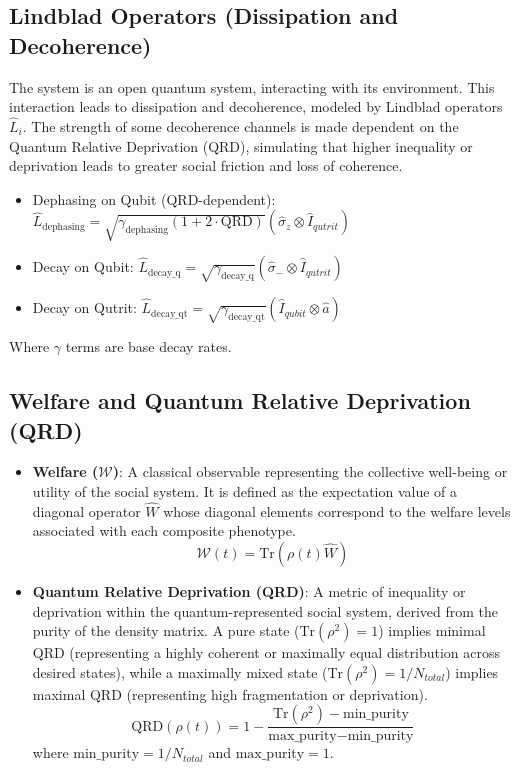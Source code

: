 \documentclass[9pt]{article}
\begin{document}
\subsection{Lindblad Operators (Dissipation and Decoherence)}
The system is an open quantum system, interacting with its environment. This interaction leads to dissipation and decoherence, modeled by Lindblad operators $\hat{L}_i$. The strength of some decoherence channels is made dependent on the Quantum Relative Deprivation (QRD), simulating that higher inequality or deprivation leads to greater social friction and loss of coherence.
\begin{itemize}
    \item Dephasing on Qubit (QRD-dependent): $\hat{L}_{\text{dephasing}} = \sqrt{\gamma_{\text{dephasing}}(1 + 2 \cdot \text{QRD})} (\hat{\sigma}_z \otimes \hat{I}_{qutrit})$
    \item Decay on Qubit: $\hat{L}_{\text{decay\_q}} = \sqrt{\gamma_{\text{decay\_q}}} (\hat{\sigma}_- \otimes \hat{I}_{qutrit})$
    \item Decay on Qutrit: $\hat{L}_{\text{decay\_qt}} = \sqrt{\gamma_{\text{decay\_qt}}} (\hat{I}_{qubit} \otimes \hat{a})$
\end{itemize}
Where $\gamma$ terms are base decay rates.

\subsection{Welfare and Quantum Relative Deprivation (QRD)}
\begin{itemize}
    \item \textbf{Welfare ($\mathcal{W}$)}: A classical observable representing the collective well-being or utility of the social system. It is defined as the expectation value of a diagonal operator $\hat{W}$ whose diagonal elements correspond to the welfare levels associated with each composite phenotype.
    $$ \mathcal{W}(t) = \text{Tr}(\rho(t) \hat{W}) $$
    \item \textbf{Quantum Relative Deprivation (QRD)}: A metric of inequality or deprivation within the quantum-represented social system, derived from the purity of the density matrix. A pure state ($\text{Tr}(\rho^2)=1$) implies minimal QRD (representing a highly coherent or maximally equal distribution across desired states), while a maximally mixed state ($\text{Tr}(\rho^2)=1/N_{total}$) implies maximal QRD (representing high fragmentation or deprivation).
    $$ \text{QRD}(\rho(t)) = 1 - \frac{\text{Tr}(\rho^2) - \text{min\_purity}}{\text{max\_purity} - \text{min\_purity}} $$
    where $\text{min\_purity} = 1/N_{total}$ and $\text{max\_purity} = 1$.
\end{itemize}
\end{document}
